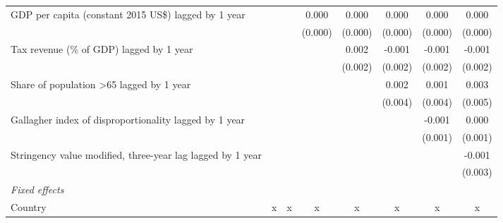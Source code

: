 \begin{tabular}{lccccccc}
   GDP per capita (constant 2015 US\$) lagged by 1 year                                                      &                &                & 0.000          & 0.000          & 0.000   & 0.000   & 0.000\\   
                                                                                                             &                &                & (0.000)        & (0.000)        & (0.000) & (0.000) & (0.000)\\   
   Tax revenue (\% of GDP) lagged by 1 year                                                                  &                &                &                & 0.002          & -0.001  & -0.001  & -0.001\\   
                                                                                                             &                &                &                & (0.002)        & (0.002) & (0.002) & (0.002)\\   
   Share of population >65 lagged by 1 year                                                                  &                &                &                &                & 0.002   & 0.001   & 0.003\\   
                                                                                                             &                &                &                &                & (0.004) & (0.004) & (0.005)\\   
   Gallagher index of disproportionality lagged by 1 year                                                    &                &                &                &                &         & -0.001  & 0.000\\   
                                                                                                             &                &                &                &                &         & (0.001) & (0.001)\\   
   Stringency value modified, three-year lag lagged by 1 year                                                &                &                &                &                &         &         & -0.001\\   
                                                                                                             &                &                &                &                &         &         & (0.003)\\   
   \emph{Fixed effects}\\
   Country                                                                                                   & x              & x              & x              & x              & x       & x       & x\\  

\end{tabular}
